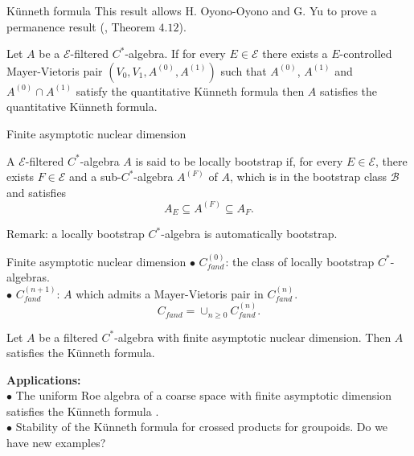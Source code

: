 
\begin{frame}{Künneth formula}
This result allows H. Oyono-Oyono and G. Yu to prove a permanence result (\cite{OY4}, Theorem $4.12$).
\begin{thmfr}
Let $A$ be a $\mathcal E$-filtered $C^*$-algebra. If for every $E\in \mathcal E$ there exists a $E$-controlled Mayer-Vietoris pair $(V_0, V_1, A^{(0)}, A^{(1)})$ such that $A^{(0)}$, $A^{(1)}$ and $A^{(0)} \cap A^{(1)}$ satisfy the quantitative Künneth formula then $A$ satisfies the quantitative Künneth formula.   
\end{thmfr}
\end{frame}

\begin{frame}{Finite asymptotic nuclear dimension}
\begin{definitionfr}
A $\mathcal E$-filtered $C^*$-algebra $A$ is said to be locally bootstrap if, for every $E\in \mathcal E$, there exists $F\in \mathcal E$ and a sub-$C^*$-algebra $A^{(F)}$ of $A$, which is in the bootstrap class $\mathcal B$ and satisfies
\[A_E \subseteq A^{(F)}\subseteq A_F. \]
\end{definitionfr}
Remark: a locally bootstrap $C^*$-algebra is automatically bootstrap.\\
\end{frame}

\begin{frame}{Finite asymptotic nuclear dimension}
$\bullet$ $C_{fand}^{(0)}$: the class of locally bootstrap $C^*$-algebras. \\
$\bullet$ $C^{(n+1)}_{fand}$: $A$ which admits a Mayer-Vietoris pair in $C_{fand}^{(n)}$.\\
\[ C_{fand}  = \cup_{n\geq 0} C_{fand}^{(n)}.\]
 
\begin{thmfr}[\cite{OY4}]
Let $A$ be a filtered $C^*$-algebra with finite asymptotic nuclear dimension. Then $A$ satisfies the Künneth formula.\\ \end{thmfr}

\textbf{Applications:} \\
$\bullet$ The uniform Roe algebra of a coarse space with finite asymptotic dimension satisfies the Künneth formula \cite{OY4}.\\ 
$\bullet$ Stability of the Künneth formula for crossed products for groupoids. Do we have new examples?\\
\end{frame}


